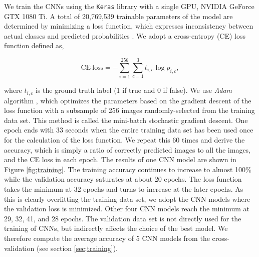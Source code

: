 \documentclass[a4paper,fleqn,usenatbib]{mnras}
\begin{document}
We train the CNNs using the {\tt Keras} library \citep{chollet2015keras} with a single GPU, NVIDIA GeForce GTX 1080 Ti.
A total of 20,769,539 trainable parameters of the model are determined by minimizing a loss function, which expresses inconsistency between actual classes and predicted probabilities \citep{Krizhevsky14oneweird}. 
We adopt a cross-entropy (CE) loss function defined as,

\begin{equation}
  \mathrm{CE\ loss}=-\sum_{i=1}^{256} \sum_{c=1}^3 t_{i,c}\log p_{i,c},
\end{equation}

\noindent
where $t_{i,c}$ is the ground truth label (1 if true and 0 if false).
We use {\it Adam} algorithm \citep{kingma2014adam}, which optimizes the parameters based on the gradient descent of the loss function with a subsample of 256 images randomly-selected from the training data set.
This method is called the mini-batch stochastic gradient descent.
One epoch ends with 33 seconds when the entire training data set has been used once for the calculation of the loss function.
We repeat this 60 times and derive the accuracy, which is simply a ratio of correctly predicted images to all the images, and the CE loss in each epoch.
The results of one CNN model are shown in Figure \ref{fig;training}.
The training accuracy continues to increase to almost 100\% while the validation accuracy saturates at about 20 epochs.
The loss function takes the minimum at 32 epochs and turns to increase at the later epochs.
As this is clearly overfitting the training data set, we adopt the CNN models where the validation loss is minimized.
Other four CNN models reach the minimum at 29, 32, 41, and 28 epochs.
The validation data set is not directly used for the training of CNNs, but indirectly affects the choice of the best model.
We therefore compute the average accuracy of 5 CNN models from the cross-validation (see section \ref{sec;training}).
\end{document}
